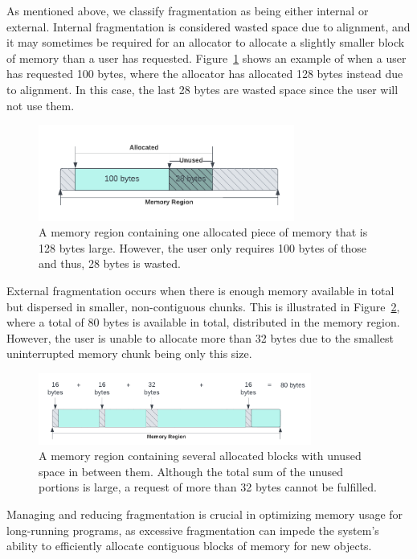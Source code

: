 
As mentioned above, we classify fragmentation as being either internal or external. Internal fragmentation is considered wasted space due to alignment, and it may sometimes be required for an allocator to allocate a slightly smaller block of memory than a user has requested. Figure~\ref{fig:internal_fragmentation} shows an example of when a user has requested 100 bytes, where the allocator has allocated 128 bytes instead due to alignment. In this case, the last 28 bytes are wasted space since the user will not use them.

\begin{figure}[H]
    \centering
    \includegraphics[width=0.75\textwidth]{figures/internal_fragmentation.png}
    \caption{A memory region containing one allocated piece of memory that is 128 bytes large. However, the user only requires 100 bytes of those and thus, 28 bytes is wasted.}
    \label{fig:internal_fragmentation}
\end{figure}

External fragmentation occurs when there is enough memory available in total but dispersed in smaller, non-contiguous chunks. This is illustrated in Figure~\ref{fig:external_fragmentation}, where a total of 80 bytes is available in total, distributed in the memory region. However, the user is unable to allocate more than 32 bytes due to the smallest uninterrupted memory chunk being only this size.

\begin{figure}[H]
    \centering
    \includegraphics[width=0.8\textwidth]{figures/external_fragmentation.png}
    \caption{A memory region containing several allocated blocks with unused space in between them. Although the total sum of the unused portions is large, a request of more than 32 bytes cannot be fulfilled.}
    \label{fig:external_fragmentation}
\end{figure}

Managing and reducing fragmentation is crucial in optimizing memory usage for long-running programs, as excessive fragmentation can impede the system's ability to efficiently allocate contiguous blocks of memory for new objects.

